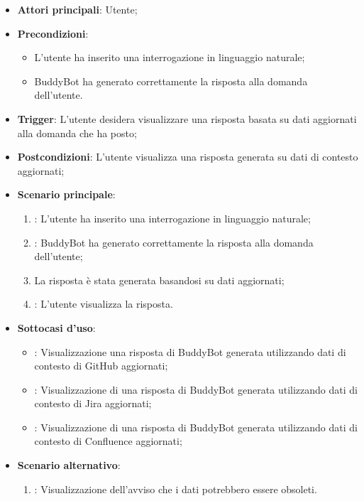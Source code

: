 \begin{itemize}
    \item \textbf{Attori principali}: Utente;
    \item \textbf{Precondizioni}: 
    \begin{itemize}
        \item L'utente ha inserito una interrogazione in linguaggio naturale;
        \item BuddyBot ha generato correttamente la risposta alla domanda dell'utente.
    \end{itemize}
    \item \textbf{Trigger}: L'utente desidera visualizzare una risposta basata su dati aggiornati alla domanda che ha posto;
    \item \textbf{Postcondizioni}: L'utente visualizza una risposta generata su dati di contesto aggiornati;
    \item \textbf{Scenario principale}:
    \begin{enumerate}
        \item {}: L'utente ha inserito una interrogazione in linguaggio naturale;
        \item {}: BuddyBot ha generato correttamente la risposta alla domanda dell'utente;
        \item La risposta è stata generata basandosi su dati aggiornati;
        \item {}: L'utente visualizza la risposta.
    \end{enumerate}
    \item \textbf{Sottocasi d'uso}:
    \begin{itemize}
        \item {}: Visualizzazione una risposta di BuddyBot generata utilizzando dati di contesto di 
        GitHub aggiornati;
        \item {}: Visualizzazione di una risposta di BuddyBot generata utilizzando dati di contesto di 
        Jira aggiornati;
        \item {}: Visualizzazione di una risposta di BuddyBot generata utilizzando dati di contesto di 
        Confluence aggiornati;
    \end{itemize}
    \item \textbf{Scenario alternativo}:
    \begin{enumerate}
        \item {}: Visualizzazione dell’avviso che i dati potrebbero essere obsoleti.
    \end{enumerate}
\end{itemize}



